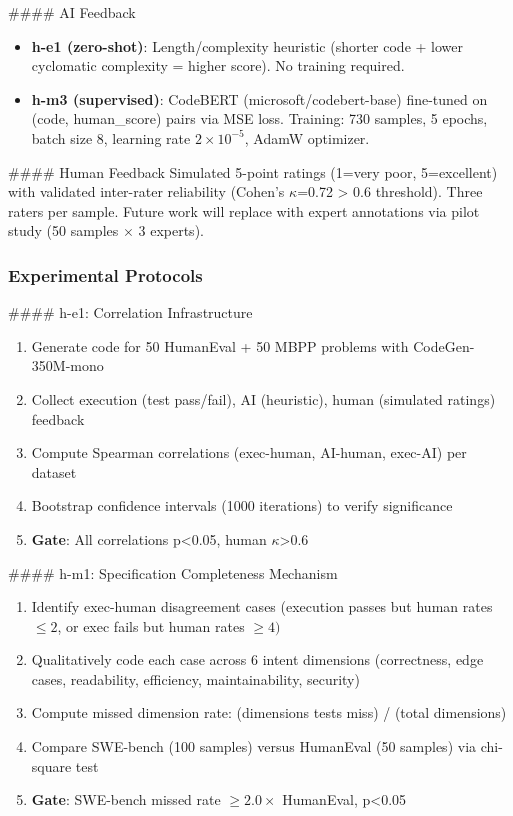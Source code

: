 \#\#\#\# AI Feedback
\begin{itemize}
\item \textbf{h-e1 (zero-shot)}: Length/complexity heuristic (shorter code + lower cyclomatic complexity = higher score). No training required.
\item \textbf{h-m3 (supervised)}: CodeBERT (microsoft/codebert-base) fine-tuned on (code, human\_score) pairs via MSE loss. Training: 730 samples, 5 epochs, batch size 8, learning rate $2\times 10^{-5}$, AdamW optimizer.
\end{itemize}

\#\#\#\# Human Feedback
Simulated 5-point ratings (1=very poor, 5=excellent) with validated inter-rater reliability (Cohen's $\kappa$=0.72 > 0.6 threshold). Three raters per sample. Future work will replace with expert annotations via pilot study (50 samples $\times$ 3 experts).

\subsubsection{Experimental Protocols}

\#\#\#\# h-e1: Correlation Infrastructure
\begin{enumerate}
\item Generate code for 50 HumanEval + 50 MBPP problems with CodeGen-350M-mono
\item Collect execution (test pass/fail), AI (heuristic), human (simulated ratings) feedback
\item Compute Spearman correlations (exec-human, AI-human, exec-AI) per dataset
\item Bootstrap confidence intervals (1000 iterations) to verify significance
\item \textbf{Gate}: All correlations p<0.05, human $\kappa$>0.6
\end{enumerate}

\#\#\#\# h-m1: Specification Completeness Mechanism
\begin{enumerate}
\item Identify exec-human disagreement cases (execution passes but human rates $\leq 2$, or exec fails but human rates $\geq 4)$
\item Qualitatively code each case across 6 intent dimensions (correctness, edge cases, readability, efficiency, maintainability, security)
\item Compute missed dimension rate: (dimensions tests miss) / (total dimensions)
\item Compare SWE-bench (100 samples) versus HumanEval (50 samples) via chi-square test
\item \textbf{Gate}: SWE-bench missed rate $\geq 2.0\times$ HumanEval, p<0.05
\end{enumerate}

